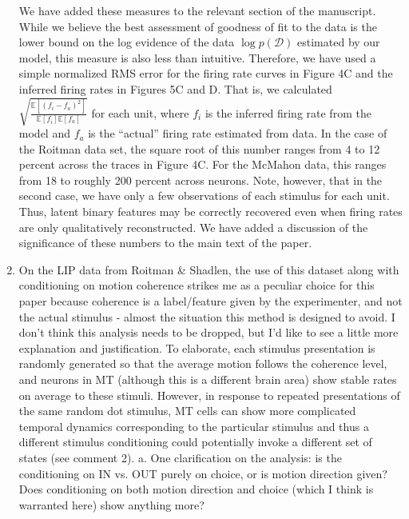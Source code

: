 \documentclass[12pt,a4paper]{article}
\newcommand{\edit}[1]{\textcolor{edit}{#1}}
\begin{document}
\begin{enumerate}
\edit{
We have added these measures to the relevant section of the manuscript. While we believe the best assessment of goodness of fit to the data is the lower bound on the log evidence of the data $\log p(\mathcal{D})$ estimated by our model, this measure is also less than intuitive.
Therefore, we have used a simple normalized RMS error for the firing rate curves in Figure 4C and the inferred firing rates in Figures 5C and D. That is, we calculated $\sqrt{\frac{\mathbb{E}[(f_i - f_a)^2]}
{\mathbb{E}[f_i]\mathbb{E}[f_a]}}$ for each unit, where $f_i$ is the inferred firing rate from the model and $f_a$ is the ``actual'' firing rate estimated from data. In the case of the Roitman data set, the square root of this number ranges from 4 to 12 percent across the traces in Figure 4C. For the McMahon data, this ranges from 18 to roughly 200 percent across neurons. Note, however, that in the second case, we have only a few observations of each stimulus for each unit. Thus, latent binary features may be correctly recovered even when firing rates are only qualitatively reconstructed. We have added a discussion of the significance of these numbers to the main text of the paper.
}

\item On the LIP data from Roitman \& Shadlen, the use of this dataset along with conditioning on motion coherence strikes me as a peculiar choice for this paper because coherence is a label/feature given by the experimenter, and not the actual stimulus - almost the situation this method is designed to avoid. I don’t think this analysis needs to be dropped, but I’d like to see a little more explanation and justification. To elaborate, each stimulus presentation is randomly generated so that the average motion follows the coherence level, and neurons in MT (although this is a different brain area) show stable rates on average to these stimuli. However, in response to repeated presentations of the same random dot stimulus, MT cells can show more complicated temporal dynamics corresponding to the particular stimulus and thus a different stimulus conditioning could potentially invoke a different set of states (see comment 2).
a. One clarification on the analysis: is the conditioning on IN vs. OUT purely on choice, or is motion direction given? Does conditioning on both motion direction and choice (which I think is warranted here) show anything more?


\end{enumerate}
\end{document}
